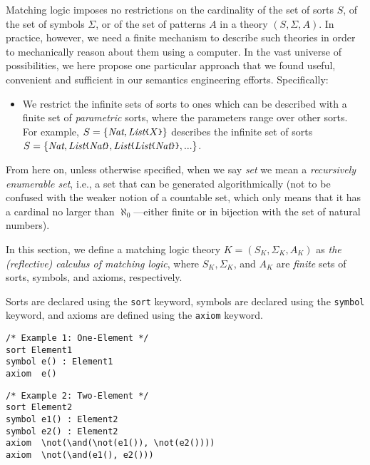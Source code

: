 \documentclass[UTF8,11pt]{article}
\theoremstyle{plain}
\theoremstyle{definition}
\theoremstyle{remark}
\newcommand{\Nat}{\textit{Nat}}
\newcommand{\List}{\textit{List}}
\newcommand{\parametric}[2]{{#1}\raisebox{.2ex}{\texttt{\footnotesize{\{}}}#2\raisebox{.2ex}{\texttt{\footnotesize{\}}}}}
\begin{document}
Matching logic imposes no restrictions on the cardinality of the set of
sorts $S$, of the set of symbols $\Sigma$, or of the set of patterns $A$
in a theory $(S,\Sigma,A)$.
In practice, however, we need a finite mechanism to describe such theories
in order to mechanically reason about them using a computer.
In the vast universe of possibilities, we here propose one particular approach
that we found useful, convenient and sufficient in our semantics engineering
efforts.
Specifically:
\begin{itemize}
	\item
	We restrict the infinite sets of sorts to ones which can be described with
	a finite set of \emph{parametric} sorts, where the parameters range over
	other sorts.
	For example, $S=\{\Nat,\parametric{\List}{X}\}$ describes the infinite set
	of sorts
	$S=\{\Nat, \parametric{\List}{\Nat}, 
	\parametric{\List}{\parametric{\List}{\Nat}}, ...\}$.
	
\end{itemize}

From here on, unless otherwise specified, when we say \emph{set} we mean
a \emph{recursively enumerable set}, i.e., a set that can be generated
algorithmically (not to be confused with the weaker notion of a
countable
set, which only means that it has a cardinal no larger than
$\aleph_0$---either finite or in bijection with the set
of natural numbers).


In this section, we define a matching logic theory $K = (S_K, \Sigma_K, A_K)$ 
as \emph{the (reflective) calculus of matching logic},
where $S_K, \Sigma_K$, and $A_K$ are \emph{finite} sets of sorts,
symbols, and axioms,  respectively.


\newcommand{\smalltt}[1]{\texttt{\small #1} }
\newcommand{\sort}{\smalltt{sort}}
\newcommand{\symb}{\smalltt{symbol}}
\newcommand{\axiom}{\smalltt{axiom}}

Sorts are declared using the \sort keyword, symbols are declared using the 
\symb keyword, and axioms are defined using the \axiom keyword.

\begin{Verbatim}[fontsize=\small]
/* Example 1: One-Element */
sort Element1
symbol e() : Element1
axiom  e()
\end{Verbatim}

\begin{Verbatim}[fontsize=\small]
/* Example 2: Two-Element */
sort Element2
symbol e1() : Element2
symbol e2() : Element2
axiom  \not(\and(\not(e1()), \not(e2())))
axiom  \not(\and(e1(), e2()))
\end{Verbatim}
\end{document}
